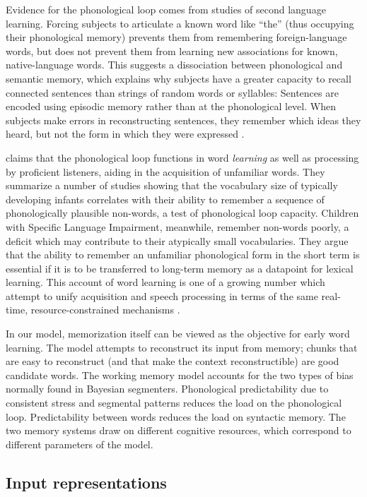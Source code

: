 \documentclass[11pt,letterpaper]{article}
\begin{document}
Evidence for the phonological loop comes from studies of second
language learning. Forcing subjects to articulate a known word like
``the'' (thus occupying their phonological memory) prevents them from
remembering foreign-language words, but does not prevent them from
learning new associations for known, native-language words. This
suggests a dissociation between phonological and semantic memory,
which explains why subjects have a greater capacity to recall
connected sentences than strings of random words or syllables:
Sentences are encoded using episodic memory rather than at the
phonological level. When subjects make errors in reconstructing
sentences, they remember which ideas they heard, but not the form in
which they were expressed \cite{Bransford71}.

 claims that the phonological loop functions in
word \textit{learning} as well as processing by proficient listeners,
aiding in the acquisition of unfamiliar words. They summarize a number
of studies showing that the vocabulary size of typically developing
infants correlates with their ability to remember a sequence of
phonologically plausible non-words, a test of phonological loop
capacity. Children with Specific Language Impairment, meanwhile,
remember non-words poorly, a deficit which may contribute to their
atypically small vocabularies. They argue that the ability to remember
an unfamiliar phonological form in the short term is essential if it
is to be transferred to long-term memory as a datapoint for lexical
learning. This account of word learning is one of a growing number
which attempt to unify acquisition and speech processing in terms of
the same real-time, resource-constrained mechanisms
\cite{Apfelbaum16}.

In our model, memorization itself can be viewed as the objective for
early word learning. The model attempts to reconstruct its input from
memory; chunks that are easy to reconstruct (and that make the context
reconstructible) are good candidate words. The working memory model
accounts for the two types of bias normally found in Bayesian
segmenters. Phonological predictability due to consistent stress
\cite{Boerschinger14} and segmental patterns \cite{Johnson09} reduces
the load on the phonological loop.  Predictability between words
reduces the load on syntactic memory. The two memory systems draw on
different cognitive resources, which correspond to different
parameters of the model.

\subsection{Input representations}
\label{sub-representations}
\end{document}
